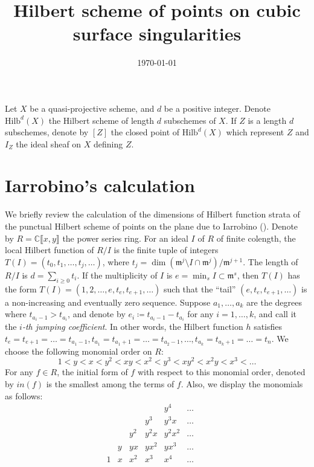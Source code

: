 \documentclass[12pt,oneside,reqno]{amsart}
\theoremstyle{definition}
\begin{document}
\title[Cubic surface singularities]{Hilbert scheme of points on cubic surface singularities}


\maketitle
\date{\today}

Let $X$ be a quasi-projective scheme, and $d$ be a positive integer. Denote $\mathrm{Hilb}^d(X)$ the Hilbert scheme of length $d$ subschemes of $X$. If $Z$ is a length $d$ subschemes, denote by $[Z]$ the closed point of $\mathrm{Hilb}^d(X)$ which represent $Z$ and $I_Z$ the ideal sheaf on $X$ defining $Z$. 

\section{Iarrobino's calculation} 
We briefly review the calculation of the dimensions of Hilbert function strata of the punctual Hilbert scheme of points on the plane due to Iarrobino (\cite[Theorem 2.12]{I77}). Denote by $R = \mathbb{C}\llbracket x, y \rrbracket$ the power series ring. For an ideal $I$ of $R$ of finite colength, the local Hilbert function of $R/I$ is the finite tuple of integers $T(I) = (t_0, t_1, \dots, t_j, \dots)$, where $t_j = \dim (\mathfrak{m}^j \setminus I \cap \mathfrak{m}^j) / \mathfrak{m}^{j + 1}$. The length of $R/I$ is $d = \sum_{i \geq 0}t_i$. If the multiplicity of $I$ is $e = \min_s I \subset \mathfrak{m}^s$, then $T(I)$ has the form $T(I) = (1, 2, \dots, e, t_e, t_{e + 1}, \dots)$ such that the ``tail'' $(e, t_e, t_{e + 1}, \dots)$ is a non-increasing and eventually zero sequence. Suppose $a_1, \dots, a_k$ are the degrees where $t_{a_i - 1} > t_{a_i}$, and denote by $e_i \coloneqq t_{a_i - 1} - t_{a_i}$ for any $i = 1, \dots, k$, and call it the \textit{$i$-th jumping coefficient}. In other words, the Hilbert function $h$ satisfies $t_e = t_{e + 1} = \dots = t_{a_1 - 1}, t_{a_1} = t_{a_1 + 1} = \dots = t_{a_2 - 1}, \dots, t_{a_k} = t_{a_k + 1} = \dots = t_n$. We choose the following monomial order on $R$:
\[
1 < y < x < y^2 < xy < x^2 < y^3 < xy^2 < x^2y < x^3 < \dots
\]
For any $f \in R$, the initial form of $f$ with respect to this monomial order, denoted by $in(f)$ is the smallest among the terms of $f$. Also, we display the monomials as follows:
\[
\begin{matrix} 
& & & & y^4 & \dots & & \\
& & & y^3 & y^3x & \dots & & \\
& & y^2 & y^2x & y^2x^2 & \dots & &\\
& y & yx & yx^2 & yx^3 & \dots & & \\
1 & x & x^2 & x^3 & x^4 & \dots & &
\end{matrix}
\]
\end{document}
